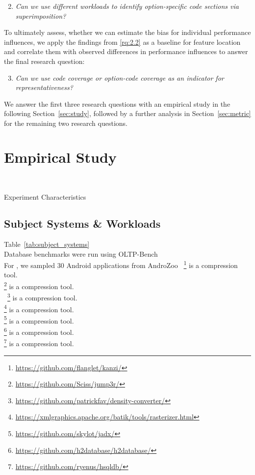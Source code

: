 \begin{enumerate}[align=left,label=RQ2.\arabic*]
	\setcounter{enumi}{1}
	\item\textit{Can we use different workloads to identify option-specific code sections via superimposition?}\label{rq:2.2}
\end{enumerate}

To ultimately assess, whether we can estimate the bias for individual performance influences, we apply the findings from \ref{rq:2.2} as a baseline for feature location and correlate them with observed differences in performance influences to answer the final research question:

\begin{enumerate}[align=left,label=RQ2.\arabic*]
	\setcounter{enumi}{2}
	\item\textit{Can we use code coverage or option-code coverage as an indicator for representativeness?}\label{rq:2.3}
\end{enumerate}

We answer the first three research questions with an empirical study in the following Section~\ref{sec:study}, followed by a further analysis in Section~\ref{sec:metric} for the remaining two research questions.

\section{Empirical Study}~\label{sec:study}
\begin{table*}[ht!]
	\centering
	\caption{Experiment Characteristics}
	
	\label{tab:subject_systems}
\end{table*}
\subsection{Subject Systems \& Workloads}
Table~\ref{tab:subject_systems}\\
Database benchmarks were run using OLTP-Bench\cite{difallah_oltp_2013}\\
For , we sampled 30 Android applications from AndroZoo~\cite{allix_androzoo_2016}
\noindent{}\footnote{\url{https://github.com/flanglet/kanzi/}} is a compression tool.\\
\footnote{\url{https://github.com/Sciss/jump3r/}} is a compression tool.\\\
\footnote{\url{https://github.com/patrickfav/density-converter/}} is a compression tool.\\
\sosy{batik}\footnote{\url{https://xmlgraphics.apache.org/batik/tools/rasterizer.html}} is a compression tool.\\
\sosy{jadx}\footnote{\url{https://github.com/skylot/jadx/}} is a compression tool.\\
\sosy{h2}\footnote{\url{https://github.com/h2database/h2database/}} is a compression tool.\\
\sosy{hsqldb}\footnote{\url{https://github.com/ryenus/hsqldb/}} is a compression tool.\\
